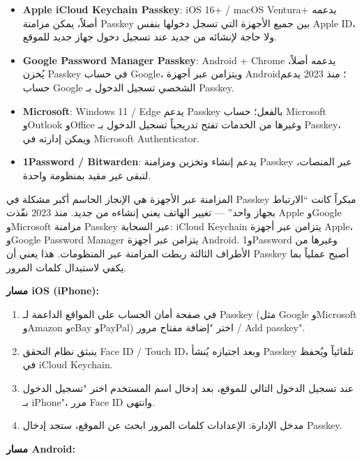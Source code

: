 \begin{itemize}
  \item \textbf{Apple iCloud Keychain Passkey}: iOS 16+ / macOS Ventura+ يدعمه أصلاً، يمكن مزامنة Passkey بين جميع الأجهزة التي تسجل دخولها بنفس Apple ID، ولا حاجة لإنشائه من جديد عند تسجيل دخول جهاز جديد للموقع.
  \item \textbf{Google Password Manager Passkey}: Android + Chrome يدعمه أصلاً، يُخزن Passkey في حساب Google، ويتزامن عبر أجهزة Android؛ منذ 2023 يدعم حساب Google الشخصي تسجيل الدخول بـ Passkey.
  \item \textbf{Microsoft}: Windows 11 / Edge يدعم Passkey بالفعل؛ حساب Microsoft وOutlook وOffice وغيرها من الخدمات تفتح تدريجياً تسجيل الدخول بـ Passkey، ويمكن إدارته في Microsoft Authenticator.
  \item \textbf{1Password / Bitwarden}: يدعم إنشاء وتخزين ومزامنة Passkey عبر المنصات، لتبقى غير مقيد بمنظومة واحدة.
\end{itemize}

\begin{tcbinfo}{المزامنة عبر الأجهزة هي الإنجاز الحاسم}
أكبر مشكلة في Passkey مبكراً كانت “الارتباط بجهاز واحد” — تغيير الهاتف يعني إنشاءه من جديد. منذ 2023 نفّذت Apple وGoogle وMicrosoft مزامنة Passkey عبر السحابة: iCloud Keychain يتزامن عبر أجهزة Apple، وGoogle Password Manager يتزامن عبر أجهزة Android. و1Password وغيرها من الأطراف الثالثة ربطت المزامنة عبر المنظومات. هذا يعني أن Passkey أصبح عملياً بما يكفي لاستبدال كلمات المرور.

\end{tcbinfo}


\textbf{مسار iOS (iPhone):}

\begin{enumerate}
  \item في صفحة أمان الحساب على المواقع الداعمة لـ Passkey (مثل Google وMicrosoft وAmazon وeBay وPayPal) اختر "إضافة مفتاح مرور / Add passkey".
  \item ينبثق نظام التحقق Face ID / Touch ID، وبعد اجتيازه يُنشأ Passkey تلقائياً ويُحفظ في iCloud Keychain.
  \item عند تسجيل الدخول التالي للموقع، بعد إدخال اسم المستخدم اختر "تسجيل الدخول بـ iPhone"، مرر Face ID وانتهى.
  \item مدخل الإدارة: الإعدادات كلمات المرور ابحث عن الموقع، ستجد إدخال Passkey.
\end{enumerate}

\textbf{مسار Android:}

